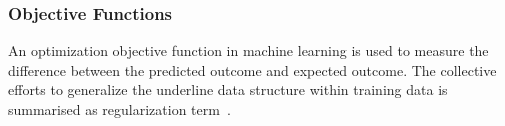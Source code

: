 \subsubsection{Objective Functions}
An optimization objective function in machine learning is used to measure the difference between the predicted outcome and expected outcome. The collective efforts to generalize the underline data structure within training data is summarised as regularization term~\cite{goodfellow_2015}.  